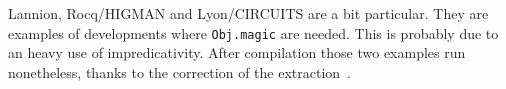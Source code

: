  Lannion, Rocq/HIGMAN and Lyon/CIRCUITS are a bit particular. They are 
 examples of developments where {\tt Obj.magic} are needed.
 This is probably due to an heavy use of impredicativity.
 After compilation those two examples run nonetheless,
 thanks to the correction of the extraction~\cite{Let02}. 

